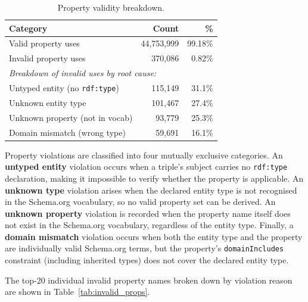 \documentclass[11pt,a4paper]{article}
\begin{document}
\begin{table}[H]
\centering
\caption{Property validity breakdown.}
\label{tab:prop_validity}
\begin{tabular}{lrr}
\toprule
\textbf{Category} & \textbf{Count} & \textbf{\%} \\
\midrule
Valid property uses   & 44{,}753{,}999 & 99.18\% \\
Invalid property uses &    370{,}086   &  0.82\% \\
\midrule
\multicolumn{3}{l}{\small\itshape Breakdown of invalid uses by root cause:} \\
\midrule
Untyped entity (no \texttt{rdf:type})  & 115{,}149 & 31.1\% \\
Unknown entity type                    & 101{,}467 & 27.4\% \\
Unknown property (not in vocab)        &  93{,}779 & 25.3\% \\
Domain mismatch (wrong type)           &  59{,}691 & 16.1\% \\
\bottomrule
\end{tabular}
\end{table}

Property violations are classified into four mutually exclusive categories.
An \textbf{untyped entity} violation occurs when a triple's subject carries no
\texttt{rdf:type} declaration, making it impossible to verify whether the
property is applicable.
An \textbf{unknown type} violation arises when the declared entity type is not
recognised in the Schema.org vocabulary, so no valid property set can be
derived.
An \textbf{unknown property} violation is recorded when the property name
itself does not exist in the Schema.org vocabulary, regardless of the entity
type.
Finally, a \textbf{domain mismatch} violation occurs when both the entity type
and the property are individually valid Schema.org terms, but the property's
\texttt{domainIncludes} constraint (including inherited types) does not cover
the declared entity type.


The top-20 individual invalid property names broken down by violation reason are shown in Table~\ref{tab:invalid_props}.
\end{document}
